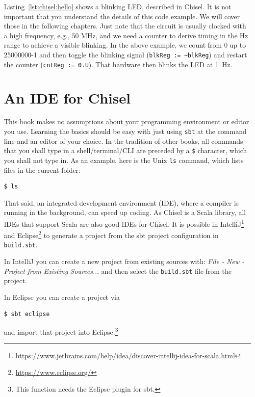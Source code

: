 \documentclass[%
    10pt,
    headinclude, footexclude,
    openright, %
    notitlepage,
    cleardoubleempty,
    headsepline,
    pointlessnumbers,
    bibtotoc, idxtotoc,
    ]{scrbook}
\newcommand{\code}[1]{{\small{\texttt{#1}}}}
\newcommand{\myref}[2]{\href{#1}{#2}}
\renewcommand{\myref}[2]{{#2}{\footnote{\url{#1}}}}
\begin{document}
Listing~\ref{lst:chisel:hello} shows a blinking LED, described in Chisel.
It is not important that you understand the details of this code example.
We will cover those in the following chapters. Just note that the circuit is
usually clocked with a high frequency, e.g., 50 MHz, and we need a counter
to derive timing in the Hz range to achieve a visible blinking. In the above
example, we count from 0 up to 25000000-1 and then toggle the blinking signal
(\code{blkReg := \textasciitilde blkReg}) and restart the counter (\code{cntReg := 0.U}).
That hardware then blinks the LED at 1~Hz.

\section{An IDE for Chisel}

This book makes no assumptions about your programming environment or editor you use.
Learning the basics should be easy with just using \code{sbt} at the command line
and an editor of your choice. In the tradition of other books, all commands that you
shall type in a shell/terminal/CLI are preceded by a \code{\$} character, which you
shall not type in. As an example, here is the Unix \code{ls} command, which lists files in
the current folder:

\begin{verbatim}
$ ls
\end{verbatim}

That said, an integrated development environment (IDE), where a compiler is running in
the background, can speed up coding. As Chisel is a Scala library, all IDEs
that support Scala are also good IDEs for Chisel.
It is possible in
\myref{https://www.jetbrains.com/help/idea/discover-intellij-idea-for-scala.html}{IntelliJ} and
 \myref{https://www.eclipse.org/}{Eclipse}
to generate a project from the sbt project configuration in \code{build.sbt}.

In IntelliJ you can create a new project from existing sources with:
\emph{File - New - Project from Existing Sources...} and then select the \code{build.sbt}
file from the project.

In Eclipse you can create a project via
\begin{verbatim}
$ sbt eclipse
\end{verbatim}
and import that project into Eclipse.\footnote{This function needs the Eclipse plugin for sbt.}
\end{document}
